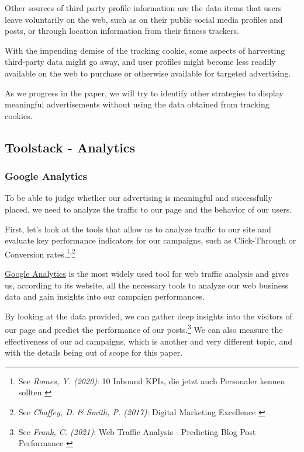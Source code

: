 Other sources of third party profile information are the data items that users leave voluntarily on the web, such as on their public social media profiles and posts, or through location information from their fitness trackers.

With the impending demise of the tracking cookie, some aspects of harvesting third-party data might go away, and user profiles might become less readily available on the web to purchase or otherwise available for targeted advertising.

As we progress in the paper, we will try to identify other strategies to display meaningful advertisements without using the data obtained from tracking cookies.

\subsection{Toolstack - Analytics}

\subsubsection{Google Analytics}

To be able to judge whether our advertising is meaningful and successfully placed, we need to analyze the traffic to our page and the behavior of our users.

First, let's look at the tools that allow us to analyze traffic to our site and evaluate key performance indicators for our campaigns, such as Click-Through or Conversion rates.\footnote{See \textit{Romes, Y. (2020)}: 10 Inbound KPIs, die jetzt auch Personaler kennen sollten \cite{inboundKPI}}\textsuperscript{,}\footnote{See \textit{Chaffey, D. \& Smith, P. (2017)}: Digital Marketing Excellence \cite{digitalMarketing}}

\href{https://analytics.google.com/}{Google Analytics} is the most widely used tool for web traffic analysis and gives us, according to its website, all the necessary tools to analyze our web business data and gain insights into our campaign performances.

By looking at the data provided, we can gather deep insights into the visitors of our page and predict the performance of our posts.\footnote{See \textit{Frank, C. (2021)}: Web Traffic Analysis - Predicting Blog Post Performance \cite{previousBigdata}} We can also measure the effectiveness of our ad campaigns, which is another and very different topic, and with the details being out of scope for this paper.

